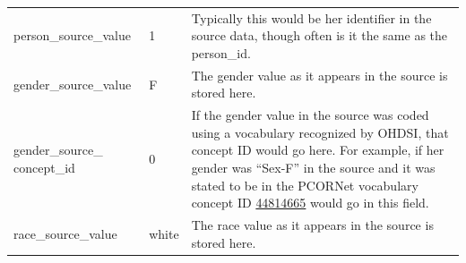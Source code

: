 \documentclass[11pt]{book}
\begin{document}
\begin{longtable}[]{@{}lll@{}}
\begin{minipage}[t]{0.28\columnwidth}\raggedright\strut
person\_source\_value\strut
\end{minipage} & \begin{minipage}[t]{0.16\columnwidth}\raggedright\strut
1\strut
\end{minipage} & \begin{minipage}[t]{0.48\columnwidth}\raggedright\strut
Typically this would be her identifier in the source data, though often
is it the same as the person\_id.\strut
\end{minipage}\tabularnewline
\begin{minipage}[t]{0.28\columnwidth}\raggedright\strut
gender\_source\_value\strut
\end{minipage} & \begin{minipage}[t]{0.16\columnwidth}\raggedright\strut
F\strut
\end{minipage} & \begin{minipage}[t]{0.48\columnwidth}\raggedright\strut
The gender value as it appears in the source is stored here.\strut
\end{minipage}\tabularnewline
\begin{minipage}[t]{0.28\columnwidth}\raggedright\strut
gender\_source\_ concept\_id\strut
\end{minipage} & \begin{minipage}[t]{0.16\columnwidth}\raggedright\strut
0\strut
\end{minipage} & \begin{minipage}[t]{0.48\columnwidth}\raggedright\strut
If the gender value in the source was coded using a vocabulary
recognized by OHDSI, that concept ID would go here. For example, if her
gender was ``Sex-F'' in the source and it was stated to be in the
PCORNet vocabulary concept ID
\href{http://athena.ohdsi.org/search-terms/terms/44814665}{44814665}
would go in this field.\strut
\end{minipage}\tabularnewline
\begin{minipage}[t]{0.28\columnwidth}\raggedright\strut
race\_source\_value\strut
\end{minipage} & \begin{minipage}[t]{0.16\columnwidth}\raggedright\strut
white\strut
\end{minipage} & \begin{minipage}[t]{0.48\columnwidth}\raggedright\strut
The race value as it appears in the source is stored here.\strut
\end{minipage}\tabularnewline

\end{longtable}
\end{document}

